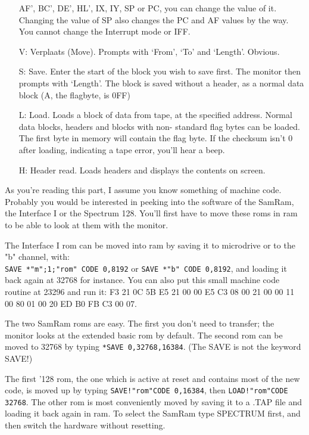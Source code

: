 \begin{itemize}
	   AF', BC', DE', HL', IX, IY, SP or PC, you can change the value
	   of it.  Changing the value of SP also changes the PC and AF
	   values by the way.  You cannot change the Interrupt mode or IFF\@.
  \item[V:] Verplaats (Move).  Prompts with `From', `To' and `Length'.
           Obvious.
  \item[S:] Save.  Enter the start of the block you wish to save first.
           The monitor then prompts with `Length'.  The block is saved
           without a header, as a normal data block (A, the flagbyte, is
           0FF)
  \item[L:] Load.  Loads a block of data from tape, at the specified
           address.  Normal data blocks, headers and blocks with non-
           standard flag bytes can be loaded.  The first byte in memory
           will contain the flag byte.  If the checksum isn't 0 after
           loading, indicating a tape error, you'll hear a beep.
  \item[H:] Header read.  Loads headers and displays the contents on
           screen.
\end{itemize}


\noindent
    As you're reading this part, I assume you know something of machine
    code.  Probably you would be interested in peeking into the software of
    the SamRam, the Interface I or the Spectrum 128.  You'll first have to
    move these roms in ram to be able to look at them with the monitor.

    The Interface I rom can be moved into ram by saving it to microdrive or
    to the "b" channel, with:\\
    \verb|SAVE *"m";1;"rom" CODE 0,8192| or \verb|SAVE *"b" CODE 0,8192|,
    and loading it back again at 32768 for instance.  You can also
    put this small machine code routine at 23296 and run it: F3 21 0C 5B E5
    21 00 00 E5 C3 08 00 21 00 00 11 00 80 01 00 20 ED B0 FB C3 00 07.

    The two SamRam roms are easy.  The first you don't need to transfer; the
    monitor looks at the extended basic rom by default.  The second rom can
    be moved to 32768 by typing \verb|*SAVE 0,32768,16384|.
    (The SAVE is not the keyword SAVE!)

    The first '128 rom, the one which is active at reset and contains most
    of the new code, is moved up by typing \verb|SAVE!"rom"CODE 0,16384|, then
    \verb|LOAD!"rom"CODE 32768|.  The other rom is most conveniently moved by
    saving it to a .TAP file and loading it back again in ram.  To select
    the SamRam type SPECTRUM first, and then switch the hardware without
    resetting.


